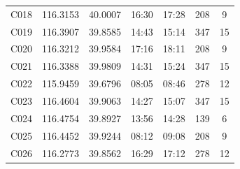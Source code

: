 \documentclass{setp-new}
\begin{document}
\begin{table}[H]
\begin{tabular*}{\textwidth}{@{\extracolsep{\fill}}ccccccc@{}}
C018 & 116.3153 & 40.0007 & 16:30 & 17:28 & 208 & 9\\
C019 & 116.3907 & 39.8585 & 14:43 & 15:14 & 347 & 15\\
C020 & 116.3212 & 39.9584 & 17:16 & 18:11 & 208 & 9\\
C021 & 116.3388 & 39.9809 & 14:31 & 15:24 & 347 & 15\\
C022 & 115.9459 & 39.6796 & 08:05 & 08:46 & 278 & 12\\
C023 & 116.4604 & 39.9063 & 14:27 & 15:07 & 347 & 15\\
C024 & 116.4754 & 39.8927 & 13:56 & 14:28 & 139 & 6\\
C025 & 116.4452 & 39.9244 & 08:12 & 09:08 & 208 & 9\\
C026 & 116.2773 & 39.8562 & 16:29 & 17:12 & 278 & 12\\
\bottomrule
\end{tabular*}
\end{table}
\end{document}
